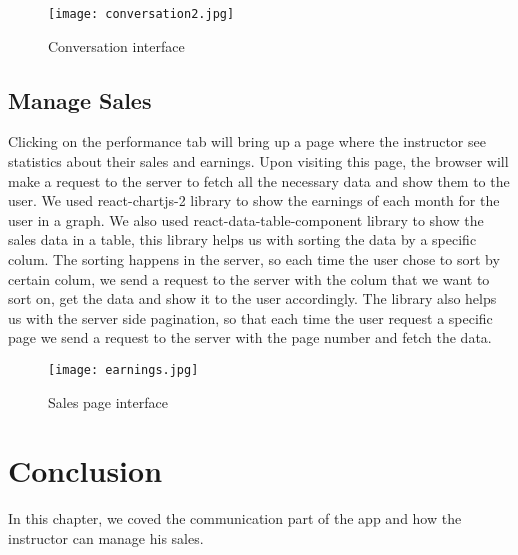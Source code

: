 \begin{figure}[!ht]
    \centering
    \texttt{[image: conversation2.jpg]}
    \caption{Conversation interface}
    \label{fig:conversation2}
\end{figure}

\subsection{Manage Sales}
Clicking on the performance tab will bring up a page where the instructor see statistics about their sales and earnings. Upon visiting this page, the browser will make a request to the server to fetch all the necessary data and show them to the user.
\hfill \break
\hfill \break
We used react-chartjs-2 library to show the earnings of each month for the user in a graph. 
\hfill \break
\hfill \break
We also used react-data-table-component library to show the sales data in a table, this library helps us with sorting the data by a specific colum. The sorting happens in the server, so each time the user chose to sort by certain colum, we send a request to the server with the colum that we want to sort on, get the data and show it to the user accordingly. The library also helps us with the server side pagination, so that each time the user request a specific page we send a request to the server with the page number and fetch the data. 

\hfill \break
\hfill \break

\begin{figure}[!ht]
    \centering
    \texttt{[image: earnings.jpg]}
    \caption{Sales page interface}
    \label{fig:earnings}
\end{figure}


\vfill
\clearpage

\section*{Conclusion}
In this chapter, we coved the communication part of the app and how the instructor can manage his sales.
